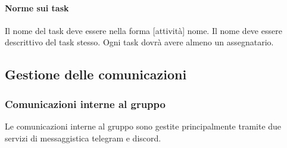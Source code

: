 \paragraph{Norme sui task} \Spazio
Il nome del task deve essere nella forma [attività] nome. Il nome deve essere descrittivo del task stesso. Ogni task dovrà avere almeno un assegnatario.

\subsection{Gestione delle comunicazioni}
\subsubsection{Comunicazioni interne al gruppo}
Le comunicazioni interne al gruppo sono gestite principalmente tramite due servizi di messaggistica telegram e discord.
